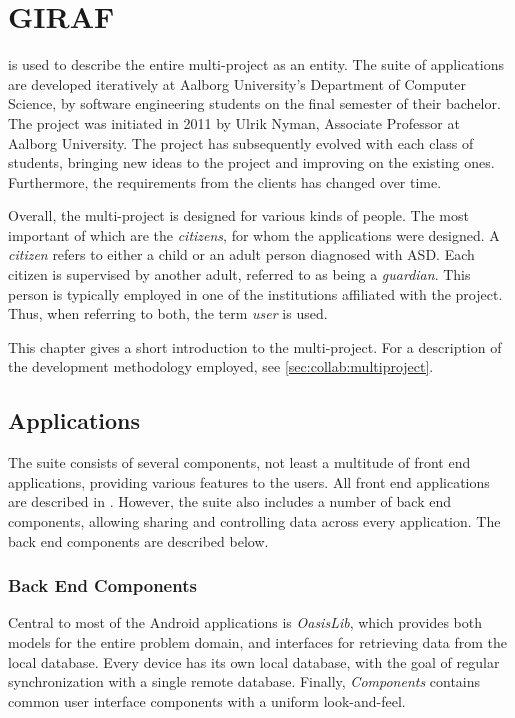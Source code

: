\chapter{GIRAF}\label{chap:giraf}
\giraf is used to describe the entire multi-project as an entity.
The suite of \giraf applications are developed iteratively at Aalborg University's Department of Computer Science, by software engineering students on the final semester of their bachelor.
The project was initiated in 2011 by Ulrik Nyman, Associate Professor at Aalborg University.
The project has subsequently evolved with each class of students, bringing new ideas to the project and improving on the existing ones.
Furthermore, the requirements from the clients has changed over time.

Overall, the multi-project is designed for various kinds of people.
The most important of which are the \textit{citizens}, for whom the applications were designed.
A \textit{citizen} refers to either a child or an adult person diagnosed with ASD.
Each citizen is supervised by another adult, referred to as being a \textit{guardian}.
This person is typically employed in one of the institutions affiliated with the \giraf project.
Thus, when referring to both, the term \textit{user} is used.

This chapter gives a short introduction to the \giraf multi-project.
For a description of the development methodology employed, see \cref{sec:collab:multiproject}.

\section{\giraf Applications}\label{sec:giraf:applications}
The \giraf suite consists of several components, not least a multitude of front end applications, providing various features to the users. 
All front end applications are described in . 
However, the suite also includes a number of back end components, allowing sharing and controlling data across every application. 
The back end components are described below.

\subsection{Back End Components}
\label{sec:giraf:applications:backend}
Central to most of the Android applications is \textit{OasisLib}, which provides both models for the entire problem domain, and interfaces for retrieving data from the local database.
Every device has its own local database, with the goal of regular synchronization with a single remote database. 
Finally, \textit{\giraf Components} contains common user interface components with a uniform look-and-feel. 

